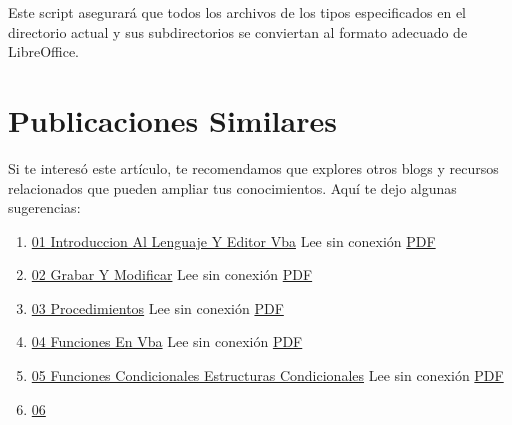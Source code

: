\documentclass[
  jou,
  floatsintext,
  longtable,
  a4paper,
  nolmodern,
  notxfonts,
  notimes,
  colorlinks=true,linkcolor=blue,citecolor=blue,urlcolor=blue]{apa7}
\providecommand{\tightlist}{%
  \setlength{\itemsep}{0pt}\setlength{\parskip}{0pt}}
\begin{document}
Este script asegurará que todos los archivos de los tipos especificados
en el directorio actual y sus subdirectorios se conviertan al formato
adecuado de LibreOffice.

\section{Publicaciones Similares}\label{publicaciones-similares}

Si te interesó este artículo, te recomendamos que explores otros blogs y
recursos relacionados que pueden ampliar tus conocimientos. Aquí te dejo
algunas sugerencias:

\begin{enumerate}
\def\labelenumi{\arabic{enumi}.}
\tightlist
\item
  \href{https://achalmaedison.netlify.app/herramientas-oficina/ofimatica/2022-12-05-01-introduccion-al-lenguaje-y-editor-vba}{01
  Introduccion Al Lenguaje Y Editor Vba} Lee sin conexión
  \href{https://achalmaedison.netlify.app/herramientas-oficina/ofimatica/2022-12-05-01-introduccion-al-lenguaje-y-editor-vba/index.pdf}{PDF}
\item
  \href{https://achalmaedison.netlify.app/herramientas-oficina/ofimatica/2022-12-12-02-grabar-y-modificar}{02
  Grabar Y Modificar} Lee sin conexión
  \href{https://achalmaedison.netlify.app/herramientas-oficina/ofimatica/2022-12-12-02-grabar-y-modificar/index.pdf}{PDF}
\item
  \href{https://achalmaedison.netlify.app/herramientas-oficina/ofimatica/2022-12-19-03-procedimientos}{03
  Procedimientos} Lee sin conexión
  \href{https://achalmaedison.netlify.app/herramientas-oficina/ofimatica/2022-12-19-03-procedimientos/index.pdf}{PDF}
\item
  \href{https://achalmaedison.netlify.app/herramientas-oficina/ofimatica/2022-12-26-04-funciones-en-vba}{04
  Funciones En Vba} Lee sin conexión
  \href{https://achalmaedison.netlify.app/herramientas-oficina/ofimatica/2022-12-26-04-funciones-en-vba/index.pdf}{PDF}
\item
  \href{https://achalmaedison.netlify.app/herramientas-oficina/ofimatica/2023-01-02-05-funciones-condicionales-estructuras-condicionales}{05
  Funciones Condicionales Estructuras Condicionales} Lee sin conexión
  \href{https://achalmaedison.netlify.app/herramientas-oficina/ofimatica/2023-01-02-05-funciones-condicionales-estructuras-condicionales/index.pdf}{PDF}
\item
  \href{https://achalmaedison.netlify.app/herramientas-oficina/ofimatica/2023-01-09-06-funciones-iterativas-estructuras-repetitivas-o-bucles}{06
}
\end{enumerate}
\end{document}
